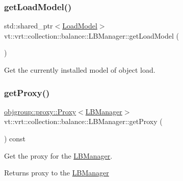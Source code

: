 \subsubsection{\texorpdfstring{get\+Load\+Model()}{getLoadModel()}}
{\footnotesize\ttfamily std\+::shared\+\_\+ptr$<$\hyperlink{classvt_1_1vrt_1_1collection_1_1balance_1_1_load_model}{Load\+Model}$>$ vt\+::vrt\+::collection\+::balance\+::\+L\+B\+Manager\+::get\+Load\+Model (\begin{DoxyParamCaption}{ }\end{DoxyParamCaption})\hspace{0.3cm}{\ttfamily [inline]}}



Get the currently installed model of object load. 

\mbox{\label{structvt_1_1vrt_1_1collection_1_1balance_1_1_l_b_manager_aa0fbba6d90873e5fa6e40767efcabb5c}} 
\subsubsection{\texorpdfstring{get\+Proxy()}{getProxy()}}
{\footnotesize\ttfamily \hyperlink{structvt_1_1objgroup_1_1proxy_1_1_proxy}{objgroup\+::proxy\+::\+Proxy}$<$\hyperlink{structvt_1_1vrt_1_1collection_1_1balance_1_1_l_b_manager}{L\+B\+Manager}$>$ vt\+::vrt\+::collection\+::balance\+::\+L\+B\+Manager\+::get\+Proxy (\begin{DoxyParamCaption}{ }\end{DoxyParamCaption}) const\hspace{0.3cm}{\ttfamily [inline]}}



Get the proxy for the \hyperlink{structvt_1_1vrt_1_1collection_1_1balance_1_1_l_b_manager}{L\+B\+Manager}. 

\begin{DoxyReturn}{Returns}
proxy to the {\ttfamily \hyperlink{structvt_1_1vrt_1_1collection_1_1balance_1_1_l_b_manager}{L\+B\+Manager}} 
\end{DoxyReturn}
\mbox{\label{structvt_1_1vrt_1_1collection_1_1balance_1_1_l_b_manager_a9e413c41427dcb83f46fbe5d3c110cd7}} 
